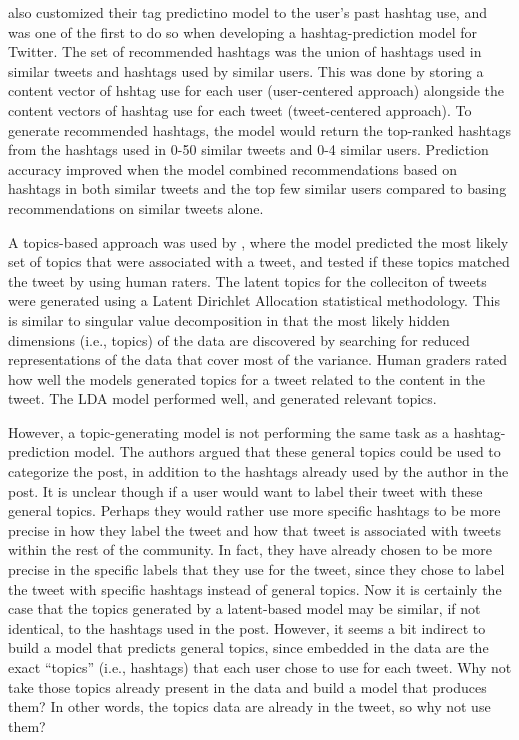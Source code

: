 \documentclass[man]{apa6}
\begin{document}
\textcite{Kywe2012} also customized their tag predictino model to the user's past hashtag use, and was one of the first to do so when developing a hashtag-prediction model for Twitter.
The set of recommended hashtags was the union of hashtags used in similar tweets and hashtags used by similar users.
This was done by storing a content vector of hshtag use for each user (user-centered approach) alongside the content vectors of hashtag use for each tweet (tweet-centered approach).
To generate recommended hashtags, the model would return the top-ranked hashtags from the hashtags used in 0-50 similar tweets and 0-4 similar users.
Prediction accuracy improved when the model combined recommendations based on hashtags in both similar tweets and the top few similar users compared to basing recommendations on similar tweets alone. 

A topics-based approach was used by \textcite{Godin2013}, where the model predicted the most likely set of topics that were associated with a tweet, and tested if these topics matched the tweet by using human raters.
The latent topics for the colleciton of tweets were generated using a Latent Dirichlet Allocation statistical methodology.
This is similar to singular value decomposition in that the most likely hidden dimensions (i.e., topics) of the data are discovered by searching for reduced representations of the data that cover most of the variance. 
Human graders rated how well the models generated topics for a tweet related to the content in the tweet.
The LDA model performed well, and generated relevant topics.

However, a topic-generating model is not performing the same task as a hashtag-prediction model.
The authors argued that these general topics could be used to categorize the post, in addition to the hashtags already used by the author in the post.
It is unclear though if a user would want to label their tweet with these general topics.
Perhaps they would rather use more specific hashtags to be more precise in how they label the tweet and how that tweet is associated with tweets within the rest of the community.
In fact, they have already chosen to be more precise in the specific labels that they use for the tweet, since they chose to label the tweet with specific hashtags instead of general topics.
Now it is certainly the case that the topics generated by a latent-based model may be similar, if not identical, to the hashtags used in the post.
However, it seems a bit indirect to build a model that predicts general topics, since embedded in the data are the exact ``topics'' (i.e., hashtags) that each user chose to use for each tweet.
Why not take those topics already present in the data and build a model that produces them?
In other words, the topics data are already in the tweet, so why not use them?
\end{document}

